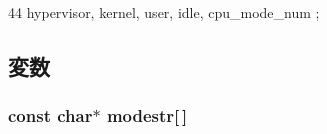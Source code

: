 \begin{DoxyCode}
44 { hypervisor, kernel, user, idle, cpu_mode_num };
\end{DoxyCode}


\subsection{変数}
\hypertarget{namespaceArmISA_1_1Kernel_aaab5092bc6d1c40a90ff4c7450649ace}{
\subsubsection[{modestr}]{\setlength{\rightskip}{0pt plus 5cm}const char$\ast$ {\bf modestr}\mbox{[}$\,$\mbox{]}}}
\label{namespaceArmISA_1_1Kernel_aaab5092bc6d1c40a90ff4c7450649ace}
